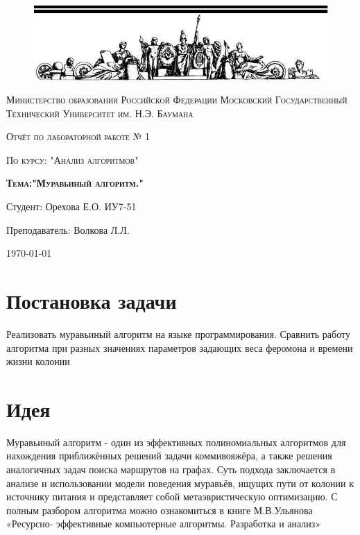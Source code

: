 \documentclass[a4paper,12pt]{article}
\begin{document}
\begin{titlepage}
	\centering
    \begin{figure}[H]
    	\includegraphics[scale=1.2]{photo}
   	\end{figure}
	{\scshape Министерство образования Российской Федерации
Московский Государственный Технический Университет им. Н.Э. Баумана \par}
	\vspace{4cm}
	{\scshape\Large Отчёт по лабораторной работе № 1\par}
    {\scshape\Large По курсу: "Анализ алгоритмов"\par}
	{\scshape\Large\bf Тема:"Муравьиный алгоритм."\par}
    \vspace{2cm}
    {\flushright Студент: Орехова Е.О. ИУ7-51\par
    \flushright Преподаватель: Волкова Л.Л.\par}
    \vspace{2cm}
	{\large \today\par}
\end{titlepage}

\def\contentaname{Содержание}
\tableofcontents %
\clearpage

\section{Постановка задачи}
    Реализовать муравьиный алгоритм на языке программирования. Сравнить работу алгоритма при разных значениях параметров задающих веса
    феромона и времени жизни колонии

\section{Идея}
    Муравьиный алгоритм - один из эффективных полиномиальных алгоритмов для
    нахождения приближённых решений задачи коммивояжёра, а также решения
    аналогичных задач поиска маршрутов на графах. Суть подхода заключается в анализе и
    использовании модели поведения муравьёв, ищущих пути от колонии к источнику питания
    и представляет собой метаэвристическую оптимизацию.
    С полным разбором алгоритма можно ознакомиться в книге М.В.Ульянова «Ресурсно-
    эффективные компьютерные алгоритмы. Разработка и анализ»
    
\end{document}

